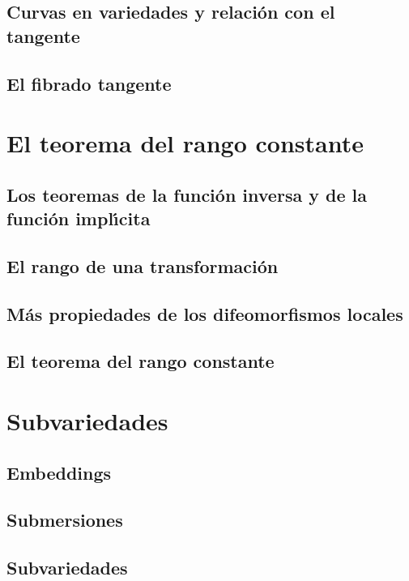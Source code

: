 \documentclass[11pt]{report}
\begin{document}
\section{Curvas en variedades y relaci\'{o}n con el tangente}

%
\section{El fibrado tangente}

%


\chapter{El teorema del rango constante}
\section{Los teoremas de la funci\'{o}n inversa y de la funci\'{o}n impl\'{\i}cita}

%
\section{El rango de una transformaci\'{o}n}

%
\section{M\'{a}s propiedades de los difeomorfismos locales}

%
\section{El teorema del rango constante}

%


\chapter{Subvariedades}
\section{Embeddings}

%
\section{Submersiones}

%
\section{Subvariedades}

%
\end{document}
